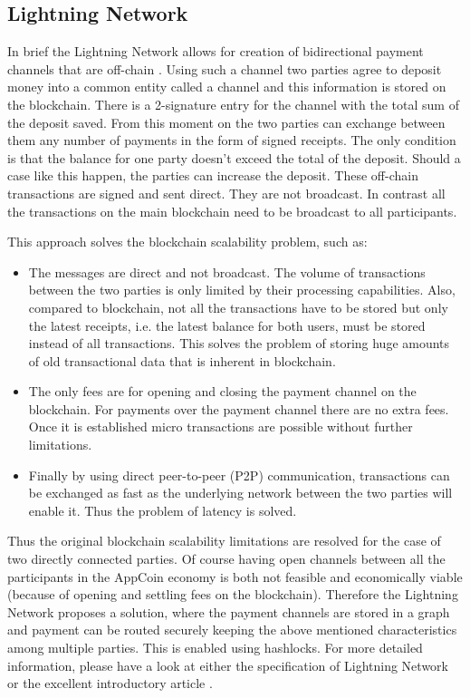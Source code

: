 \subsection{Lightning Network}
In brief the Lightning Network allows for creation of bidirectional payment channels that are off-chain \cite{LighthingNetwork}. Using such a channel two parties agree to deposit money into a common entity called a channel and this information is stored on the blockchain. There is a 2-signature entry for the channel with the total sum of the deposit saved. From this moment on the two parties can exchange between them any number of payments in the form of signed receipts. The only condition is that the balance for one party doesn't exceed the total of the deposit. Should a case like this happen, the parties can increase the deposit. These off-chain transactions are signed and sent direct. They are not broadcast. In contrast all the transactions on the main blockchain need to be broadcast to all participants. 

\medskip

This approach solves the blockchain scalability problem, such as:

\begin{itemize}
    \item The messages are direct and not broadcast. The volume of transactions between the two parties is only limited by their processing capabilities. Also, compared to blockchain, not all the transactions have to be stored but only the latest receipts, i.e. the latest balance for both users, must be stored instead of all transactions. This solves the problem of storing huge amounts of old transactional data that is inherent in blockchain.
    \item The only fees are for opening and closing the payment channel on the blockchain. For payments over the payment channel there are no extra fees. Once it is established micro transactions are possible without further limitations.
    \item Finally by using direct peer-to-peer (P2P) communication, transactions can be exchanged as fast as the underlying network between the two parties will enable it. Thus the problem of latency is solved.
\end{itemize}

Thus the original blockchain scalability limitations are resolved for the case of two directly connected parties. Of course having open channels between all the participants in the AppCoin economy is both not feasible and economically viable (because of opening and settling fees on the blockchain). Therefore the Lightning Network proposes a solution, where the payment channels are stored in a graph and payment can be routed securely keeping the above mentioned characteristics among multiple parties. This is enabled using hashlocks. For more detailed information, please have a look at either the specification of Lightning Network or the excellent introductory article \cite{starkness}.



